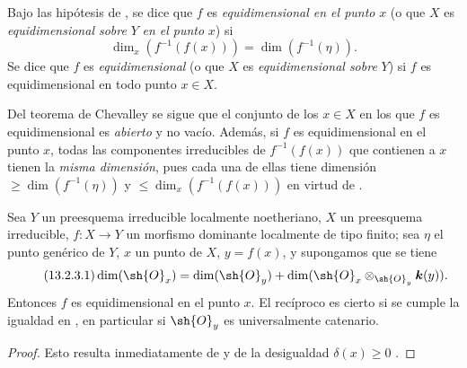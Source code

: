 \begin{definition}[13.2.2]
\label{IV.13.2.2}
Bajo las hipótesis de , se dice que $f$ es \emph{equidimensional en el punto} $x$ (o que $X$ es \emph{equidimensional sobre} $Y$ \emph{en el punto} $x$) si
\[
  \dim_x(f^{-1}(f(x)))=\dim(f^{-1}(\eta)).
\]
Se dice que $f$ es \emph{equidimensional} (o que $X$ es \emph{equidimensional sobre} $Y$) si $f$ es equidimensional en todo punto $x\in X$.
\end{definition}

Del teorema de Chevalley  se sigue que el conjunto de los $x\in X$ en los que $f$ es equidimensional es \emph{abierto} y no vacío.
Además, si $f$ es equidimensional en el punto $x$, todas las componentes irreducibles de $f^{-1}(f(x))$ que contienen a $x$ tienen la \emph{misma dimensión}, pues cada una de ellas tiene dimensión $\geq\dim(f^{-1}(\eta))$  y $\leq\dim_x(f^{-1}(f(x)))$ en virtud de .

\begin{proposition}[13.2.3]
\label{IV.13.2.3}
Sea $Y$ un preesquema irreducible localmente noetheriano, $X$ un preesquema irreducible, $f:X\to Y$ un morfismo dominante localmente de tipo finito; sea $\eta$ el punto genérico de $Y$, $x$ un punto de $X$, $y=f(x)$, y supongamos que se tiene
\[
\label{IV.13.2.3.1}
\tag{13.2.3.1}
  \dim(\sh{O}_x)=\dim(\sh{O}_y)+\dim(\sh{O}_x\otimes_{\sh{O}_y}\boldsymbol k(y)).
\]
Entonces $f$ es equidimensional en el punto $x$.
El recíproco es cierto si se cumple la igualdad en , en particular si $\sh{O}_y$ es universalmente catenario.
\end{proposition}

\begin{proof}
Esto resulta inmediatamente de  y de la desigualdad $\delta(x)\geq 0$ .
\end{proof}

